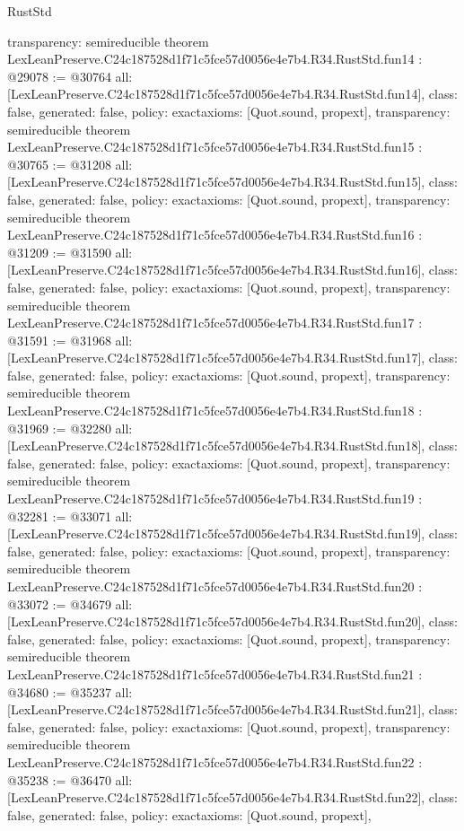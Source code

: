 \begin{lexlean}{RustStd}
\begin{coremodule}
{  transparency: semireducible
}
theorem LexLeanPreserve.C24c187528d1f71c5fce57d0056e4e7b4.R34.RustStd.fun14 : @29078 := @30764 {
  all: [LexLeanPreserve.C24c187528d1f71c5fce57d0056e4e7b4.R34.RustStd.fun14],
  class: false,
  generated: false,
  policy: exact{axioms: [Quot.sound, propext]},
  transparency: semireducible
}
theorem LexLeanPreserve.C24c187528d1f71c5fce57d0056e4e7b4.R34.RustStd.fun15 : @30765 := @31208 {
  all: [LexLeanPreserve.C24c187528d1f71c5fce57d0056e4e7b4.R34.RustStd.fun15],
  class: false,
  generated: false,
  policy: exact{axioms: [Quot.sound, propext]},
  transparency: semireducible
}
theorem LexLeanPreserve.C24c187528d1f71c5fce57d0056e4e7b4.R34.RustStd.fun16 : @31209 := @31590 {
  all: [LexLeanPreserve.C24c187528d1f71c5fce57d0056e4e7b4.R34.RustStd.fun16],
  class: false,
  generated: false,
  policy: exact{axioms: [Quot.sound, propext]},
  transparency: semireducible
}
theorem LexLeanPreserve.C24c187528d1f71c5fce57d0056e4e7b4.R34.RustStd.fun17 : @31591 := @31968 {
  all: [LexLeanPreserve.C24c187528d1f71c5fce57d0056e4e7b4.R34.RustStd.fun17],
  class: false,
  generated: false,
  policy: exact{axioms: [Quot.sound, propext]},
  transparency: semireducible
}
theorem LexLeanPreserve.C24c187528d1f71c5fce57d0056e4e7b4.R34.RustStd.fun18 : @31969 := @32280 {
  all: [LexLeanPreserve.C24c187528d1f71c5fce57d0056e4e7b4.R34.RustStd.fun18],
  class: false,
  generated: false,
  policy: exact{axioms: [Quot.sound, propext]},
  transparency: semireducible
}
theorem LexLeanPreserve.C24c187528d1f71c5fce57d0056e4e7b4.R34.RustStd.fun19 : @32281 := @33071 {
  all: [LexLeanPreserve.C24c187528d1f71c5fce57d0056e4e7b4.R34.RustStd.fun19],
  class: false,
  generated: false,
  policy: exact{axioms: [Quot.sound, propext]},
  transparency: semireducible
}
theorem LexLeanPreserve.C24c187528d1f71c5fce57d0056e4e7b4.R34.RustStd.fun20 : @33072 := @34679 {
  all: [LexLeanPreserve.C24c187528d1f71c5fce57d0056e4e7b4.R34.RustStd.fun20],
  class: false,
  generated: false,
  policy: exact{axioms: [Quot.sound, propext]},
  transparency: semireducible
}
theorem LexLeanPreserve.C24c187528d1f71c5fce57d0056e4e7b4.R34.RustStd.fun21 : @34680 := @35237 {
  all: [LexLeanPreserve.C24c187528d1f71c5fce57d0056e4e7b4.R34.RustStd.fun21],
  class: false,
  generated: false,
  policy: exact{axioms: [Quot.sound, propext]},
  transparency: semireducible
}
theorem LexLeanPreserve.C24c187528d1f71c5fce57d0056e4e7b4.R34.RustStd.fun22 : @35238 := @36470 {
  all: [LexLeanPreserve.C24c187528d1f71c5fce57d0056e4e7b4.R34.RustStd.fun22],
  class: false,
  generated: false,
  policy: exact{axioms: [Quot.sound, propext]},
}
\end{coremodule}
\end{lexlean}
